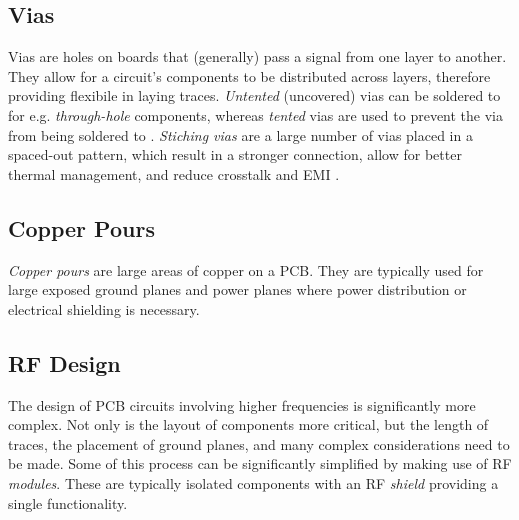 \subsection{Vias}
Vias are holes on boards that (generally) pass a signal from one layer to another. They allow for a circuit's components to be distributed across layers, therefore providing flexibile in laying traces. \textit{Untented} (uncovered) vias can be soldered to for e.g. \textit{through-hole} components, whereas \textit{tented} vias are used to prevent the via from being soldered to \cite{site-pcbBasics}. \textit{Stiching vias} are a large number of vias placed in a spaced-out pattern, which result in a stronger connection, allow for better thermal management, and reduce crosstalk and EMI \cite{site-viaStitching}.

\subsection{Copper Pours}
\textit{Copper pours} are large areas of copper on a PCB. They are typically used for large exposed ground planes and power planes where power distribution or electrical shielding is necessary.

\subsection{RF Design}
The design of PCB circuits involving higher frequencies is significantly more complex. Not only is the layout of components more critical, but the length of traces, the placement of ground planes, and many complex considerations need to be made. Some of this process can be significantly simplified by making use of RF \textit{modules}. These are typically isolated components with an RF \textit{shield} providing a single functionality.

